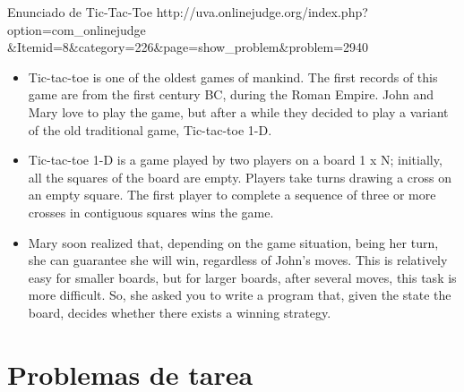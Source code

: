 \documentclass{beamer}
\begin{document}
\begin{frame}{Enunciado de Tic-Tac-Toe}
    \small http://uva.onlinejudge.org/index.php?option=com\_onlinejudge \\ 
           \&Itemid=8\&category=226\&page=show\_problem\&problem=2940
    \begin{itemize}
        \item Tic-tac-toe is one of the oldest games of mankind. The first records of this game are from the first century BC, during the Roman Empire. John and Mary love to play the game, but after a while they decided to play a variant of the old traditional game, Tic-tac-toe 1-D.
        \item Tic-tac-toe 1-D is a game played by two players on a board 1 x N; initially, all the squares of the board are empty. Players take turns drawing a cross on an empty square. The first player to complete a sequence of three or more crosses in contiguous squares wins the game.
        \item Mary soon realized that, depending on the game situation, being her turn, she can guarantee she will win, regardless of John's moves. This is relatively easy for smaller boards, but for larger boards, after several moves, this task is more difficult. So, she asked you to write a program that, given the state the board, decides whether there exists a winning strategy.
    \end{itemize}
\end{frame}


\section{Problemas de tarea}
\end{document}
